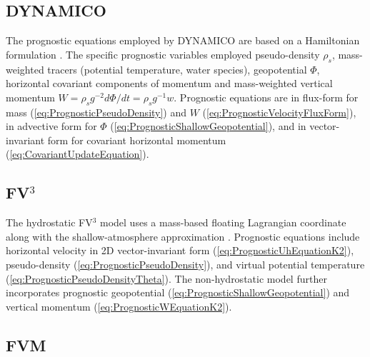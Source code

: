 \documentclass[gmd, manuscript]{copernicus}
\providecommand{\DIFadd}[1]{{\protect\color{blue}\uwave{#1}}} %
\providecommand{\DIFaddbegin}{} %
\providecommand{\DIFaddend}{} %
\begin{document}
\DIFaddend \subsection{DYNAMICO} \label{sec:DYNAMICOEquations}

The prognostic equations employed by DYNAMICO are based on a Hamiltonian formulation \citep{Dubos2014Equations}. The specific prognostic variables employed \DIFaddbegin \DIFadd{are }\DIFaddend pseudo-density $\rho_s$, mass-weighted tracers (potential temperature, water species), geopotential $\Phi$, horizontal covariant components of momentum and mass-weighted vertical momentum $W = \rho_s g^{-2} d\Phi/dt = \rho_s g^{-1} w$. Prognostic equations are in flux-form for mass (\ref{eq:PrognosticPseudoDensity}) and $W$ (\ref{eq:PrognosticVelocityFluxForm}), in advective form for $\Phi$ (\ref{eq:PrognosticShallowGeopotential}), and in vector-invariant form for covariant horizontal momentum (\ref{eq:CovariantUpdateEquation}).

\subsection{FV$^3$} \label{sec:FV3Equations}

The hydrostatic FV$^3$ model uses a mass-based floating Lagrangian coordinate along with the shallow-atmosphere approximation \citep{lin2004vertically}.  Prognostic equations include horizontal velocity in 2D vector-invariant form (\ref{eq:PrognosticUhEquationK2}), pseudo-density (\ref{eq:PrognosticPseudoDensity}), and virtual potential temperature (\ref{eq:PrognosticPseudoDensityTheta}).  The non-hydrostatic model further incorporates prognostic geopotential (\ref{eq:PrognosticShallowGeopotential}) and vertical momentum (\ref{eq:PrognosticWEquationK2}).

\subsection{FVM} \label{sec:FVMEquations}
\end{document}
